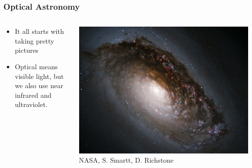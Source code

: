 \documentclass{beamer}
\begin{document}
\frame
{

    \frametitle{Optical Astronomy}


    \begin{columns}
        \begin{column}{0.5\textwidth}
            \begin{itemize}

                \item It all starts with taking pretty pictures

                \item Optical means visible light, but we also use near infrared
                    and ultraviolet.

            \end{itemize}
        \end{column}
        \begin{column}{0.5\textwidth}
            \begin{center}
                \includegraphics[width=\textwidth]{m64-black-eye-galaxy.jpg}
                \newline
                {\tiny NASA, S. Smartt, D. Richstone}
            \end{center}

            
        \end{column}
    \end{columns}


}
\end{document}
